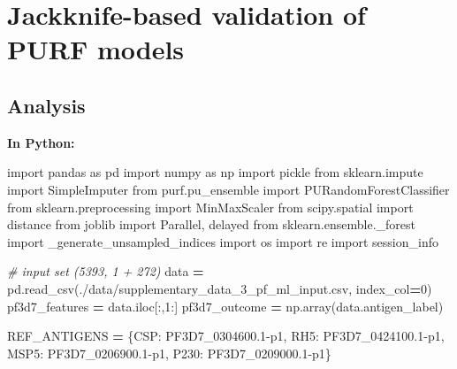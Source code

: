 \documentclass[
  11pt,
  oneside]{book}
\newenvironment{Shaded}{\begin{snugshade}}{\end{snugshade}}
\newcommand{\CommentTok}[1]{\textcolor[rgb]{0.56,0.35,0.01}{\textit{#1}}}
\newcommand{\DecValTok}[1]{\textcolor[rgb]{0.00,0.00,0.81}{#1}}
\newcommand{\ImportTok}[1]{#1}
\newcommand{\NormalTok}[1]{#1}
\newcommand{\OperatorTok}[1]{\textcolor[rgb]{0.81,0.36,0.00}{\textbf{#1}}}
\newcommand{\StringTok}[1]{\textcolor[rgb]{0.31,0.60,0.02}{#1}}
\begin{document}
\hypertarget{jackknife-based-validation-of-purf-models}{%
\section{Jackknife-based validation of PURF models}\label{jackknife-based-validation-of-purf-models}}

\hypertarget{analysis-3}{%
\subsection{Analysis}\label{analysis-3}}

\textbf{In Python: }

\begin{Shaded}
\begin{Highlighting}[]
\ImportTok{import}\NormalTok{ pandas }\ImportTok{as}\NormalTok{ pd}
\ImportTok{import}\NormalTok{ numpy }\ImportTok{as}\NormalTok{ np}
\ImportTok{import}\NormalTok{ pickle}
\ImportTok{from}\NormalTok{ sklearn.impute }\ImportTok{import}\NormalTok{ SimpleImputer}
\ImportTok{from}\NormalTok{ purf.pu\_ensemble }\ImportTok{import}\NormalTok{ PURandomForestClassifier}
\ImportTok{from}\NormalTok{ sklearn.preprocessing }\ImportTok{import}\NormalTok{ MinMaxScaler}
\ImportTok{from}\NormalTok{ scipy.spatial }\ImportTok{import}\NormalTok{ distance}
\ImportTok{from}\NormalTok{ joblib }\ImportTok{import}\NormalTok{ Parallel, delayed}
\ImportTok{from}\NormalTok{ sklearn.ensemble.\_forest }\ImportTok{import}\NormalTok{ \_generate\_unsampled\_indices}
\ImportTok{import}\NormalTok{ os}
\ImportTok{import}\NormalTok{ re}
\ImportTok{import}\NormalTok{ session\_info}
\end{Highlighting}
\end{Shaded}

\begin{Shaded}
\begin{Highlighting}[]
\CommentTok{\# input set (5393, 1 + 272)}
\NormalTok{data }\OperatorTok{=}\NormalTok{ pd.read\_csv(}\StringTok{\textquotesingle{}./data/supplementary\_data\_3\_pf\_ml\_input.csv\textquotesingle{}}\NormalTok{, index\_col}\OperatorTok{=}\DecValTok{0}\NormalTok{)}
\NormalTok{pf3d7\_features }\OperatorTok{=}\NormalTok{ data.iloc[:,}\DecValTok{1}\NormalTok{:]}
\NormalTok{pf3d7\_outcome }\OperatorTok{=}\NormalTok{ np.array(data.antigen\_label)}

\NormalTok{REF\_ANTIGENS }\OperatorTok{=}\NormalTok{ \{}\StringTok{\textquotesingle{}CSP\textquotesingle{}}\NormalTok{: }\StringTok{\textquotesingle{}PF3D7\_0304600.1{-}p1\textquotesingle{}}\NormalTok{, }\StringTok{\textquotesingle{}RH5\textquotesingle{}}\NormalTok{: }\StringTok{\textquotesingle{}PF3D7\_0424100.1{-}p1\textquotesingle{}}\NormalTok{, }\StringTok{\textquotesingle{}MSP5\textquotesingle{}}\NormalTok{: }\StringTok{\textquotesingle{}PF3D7\_0206900.1{-}p1\textquotesingle{}}\NormalTok{, }\StringTok{\textquotesingle{}P230\textquotesingle{}}\NormalTok{: }\StringTok{\textquotesingle{}PF3D7\_0209000.1{-}p1\textquotesingle{}}\NormalTok{\}}
\end{Highlighting}
\end{Shaded}
\end{document}
